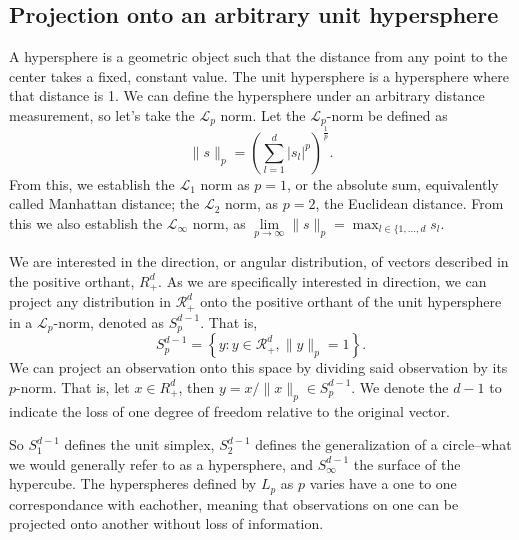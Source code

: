 \subsection{Projection onto an arbitrary unit hypersphere}
A hypersphere is a geometric object such that the distance from any point to the center takes a fixed, 
  constant value.  The unit hypersphere is a hypersphere where that distance is 1. We can define the
  hypersphere under an arbitrary distance measurement, so let's take the $\mathcal{L}_p$ norm. Let 
  the $\mathcal{L}_p$-norm be defined as
  \begin{equation*}
    \lVert s \rVert_p = \left(\sum_{l = 1}^d \lvert s_l\rvert^p\right)^{\frac{1}{p}}.
  \end{equation*}
  From this, we establish the $\mathcal{L}_1$ norm as $p = 1$, or the absolute sum, equivalently called
  Manhattan distance; the $\mathcal{L}_2$ norm, as $p = 2$, the Euclidean distance.  From this we
  also establish the $\mathcal{L}_{\infty}$ norm, as
  $\lim\limits_{p\to\infty} \lVert s \rVert_p = \max_{l\in\lbrace{1,\ldots,d}}s_l$.

We are interested in the direction, or angular distribution, of vectors described in the positive 
  orthant, $R_{+}^d$.  As we are specifically interested in direction, we can project any 
  distribution in $\mathcal{R}_{+}^d$ onto the positive orthant of the unit hypersphere in a 
  $\mathcal{L}_p$-norm, denoted as $S_{p}^{d-1}$.  That is,
  \begin{equation*}
    S_{p}^{d-1} = \left\lbrace y : y \in \mathcal{R}_{+}^{d}, \lVert y\rVert_{p} = 1\right\rbrace.
  \end{equation*}
  We can project an observation onto this space by dividing said observation by its $p$-norm.  That
  is, let $x\in R_{+}^{d}$, then $y = x / \lVert x\rVert_p \in S_{p}^{d-1}$.  We denote the $d-1$
  to indicate the loss of one degree of freedom relative to the original vector.

So $S_{1}^{d-1}$ defines the unit simplex, $S_{2}^{d-1}$ defines the generalization of a
  circle--what we would generally refer to as a hypersphere, and $S_{\infty}^{d-1}$ the surface of
  the hypercube. The hyperspheres defined by $L_p$ as $p$ varies have a one to one correspondance
  with eachother, meaning that observations on one can be projected onto another without loss of
  information.

